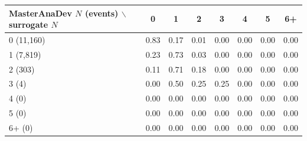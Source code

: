 \begin{tabular}{lccccccc}
\toprule
MasterAnaDev $N$ (events) $\backslash$ surrogate $N$ & 0 & 1 & 2 & 3 & 4 & 5 & 6+ \\
\midrule
0 (11,160) & 0.83 & 0.17 & 0.01 & 0.00 & 0.00 & 0.00 & 0.00 \\
1 (7,819) & 0.23 & 0.73 & 0.03 & 0.00 & 0.00 & 0.00 & 0.00 \\
2 (303) & 0.11 & 0.71 & 0.18 & 0.00 & 0.00 & 0.00 & 0.00 \\
3 (4) & 0.00 & 0.50 & 0.25 & 0.25 & 0.00 & 0.00 & 0.00 \\
4 (0) & 0.00 & 0.00 & 0.00 & 0.00 & 0.00 & 0.00 & 0.00 \\
5 (0) & 0.00 & 0.00 & 0.00 & 0.00 & 0.00 & 0.00 & 0.00 \\
6+ (0) & 0.00 & 0.00 & 0.00 & 0.00 & 0.00 & 0.00 & 0.00 \\
\bottomrule
\end{tabular}
